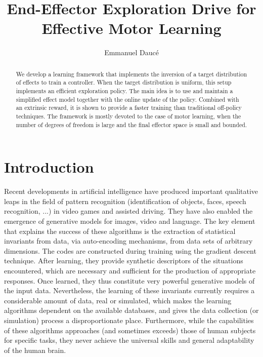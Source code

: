 \documentclass[runningheads]{llncs}
\begin{document}
%
\title{End-Effector Exploration Drive for Effective Motor Learning}
%
%
\author{Emmanuel Daucé}
%
%
%
\maketitle              %
%
\begin{abstract}
We develop a learning framework that implements the inversion of a target distribution
of effects to train a controller. When the target distribution is uniform, this
setup implements an efficient exploration policy. The main idea is to use and maintain a simplified effect model together with the online update of the policy.
Combined with an extrinsic reward, it is shown to provide a faster 
training than traditional off-policy techniques. 
The framework is mostly devoted to the case of motor learning, when
the number of degrees of freedom is large and the final effector space
is small and bounded.   
\end{abstract}
%
%
%
\section{Introduction}

Recent developments in artificial intelligence have produced important qualitative leaps in the field of pattern recognition (identification of objects, faces, speech recognition, ...) in video games and assisted driving. 
They have also enabled the emergence of generative models for images, video and language. The key element that explains the success of these algorithms is the extraction of statistical invariants from data, via auto-encoding mechanisms, from data sets of arbitrary dimensions. The codes are constructed during training using the gradient descent technique. After learning, they provide synthetic descriptors of the situations encountered, which are necessary and sufficient for the production of appropriate responses.  Once learned, they thus constitute very powerful generative models of the input data. Nevertheless, the learning of these invariants currently requires a considerable amount of data, real or simulated, which makes the learning algorithms dependent on the available databases, and gives the data collection (or simulation) process a disproportionate place. Furthermore, while the capabilities of these algorithms approaches (and sometimes exceeds) those of human subjects for specific tasks, they never achieve the universal skills and general adaptability of the human brain. 
\end{document}
